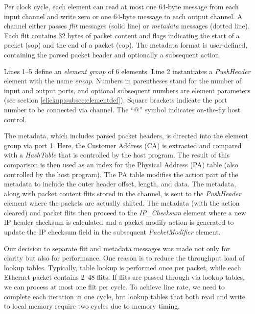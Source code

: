 Per clock cycle, each element can read at most one 64-byte message from each input channel and write zero or one 64-byte message to each output channel. A channel either passes \textit{flit} messages (solid line) or \textit{metadata} messages (dotted line). Each flit contains 32 bytes of packet content and flags indicating the start of a packet (sop) and the end of a packet (eop). The metadata format is user-defined, containing the parsed packet header and optionally a subsequent action.

Lines 1--5 define an \textit{element group} of 6 elements. Line 2 instantiates a \textit{PushHeader} element with the name \textit{encap}. Numbers in parentheses stand for the number of input and output ports, and optional subsequent numbers are element parameters (see section \ref{clicknp:subsec:elementdef}). Square brackets indicate the port number to be connected via channel. The ``@'' symbol indicates on-the-fly host control.

The metadata, which includes parsed packet headers, is directed into the element group via port 1. Here, the Customer Address (CA) is extracted and compared with a \textit{HashTable} that is controlled by the host program. The result of this comparison is then used as an index for the Physical Address (PA) table (also controlled by the host program). The PA table modifies the action part of the metadata to include the outer header offset, length, and data. The metadata, along with packet content flits stored in the channel, is sent to the \textit{PushHeader} element where the packets are actually shifted. The metadata (with the action cleared) and packet flits then proceed to the \textit{IP\_Checksum} element where a new IP header checksum is calculated and a packet modify action is generated to update the IP checksum field in the subsequent \textit{PacketModifier} element.

Our decision to separate flit and metadata messages was made not only for clarity but also for performance. One reason is to reduce the throughput load of lookup tables. Typically, table lookup is performed once per packet, while each Ethernet packet contains 2--48 flits. If flits are passed through via lookup tables, we can process at most one flit per cycle. To achieve line rate, we need to complete each iteration in one cycle, but lookup tables that both read and write to local memory require two cycles due to memory timing.

